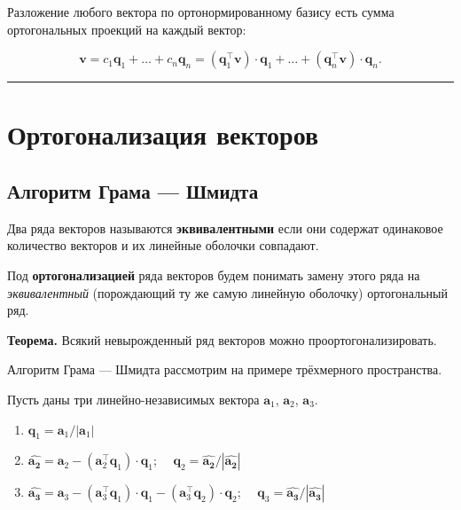 \documentclass[11pt,a4paper]{article}
\providecommand{\tightlist}{%
      \setlength{\itemsep}{0pt}\setlength{\parskip}{0pt}}
\begin{document}
Разложение любого вектора по ортонормированному базису есть сумма
ортогональных проекций на каждый вектор:

\[
  \mathbf{v} = c_1 \mathbf{q}_1 + \ldots + c_n \mathbf{q}_n = (\mathbf{q}_1^\top \mathbf{v}) \cdot \mathbf{q}_1 + \ldots + (\mathbf{q}_n^\top \mathbf{v}) \cdot \mathbf{q}_n.
\]

    \begin{center}\rule{0.5\linewidth}{0.5pt}\end{center}

    \hypertarget{ux43eux440ux442ux43eux433ux43eux43dux430ux43bux438ux437ux430ux446ux438ux44f-ux432ux435ux43aux442ux43eux440ux43eux432}{%
\section{Ортогонализация
векторов}\label{ux43eux440ux442ux43eux433ux43eux43dux430ux43bux438ux437ux430ux446ux438ux44f-ux432ux435ux43aux442ux43eux440ux43eux432}}

\hypertarget{ux430ux43bux433ux43eux440ux438ux442ux43c-ux433ux440ux430ux43cux430-ux448ux43cux438ux434ux442ux430}{%
\subsection{Алгоритм Грама ---
Шмидта}\label{ux430ux43bux433ux43eux440ux438ux442ux43c-ux433ux440ux430ux43cux430-ux448ux43cux438ux434ux442ux430}}

Два ряда векторов называются \textbf{эквивалентными} если они содержат
одинаковое количество векторов и их линейные оболочки совпадают.

Под \textbf{ортогонализацией} ряда векторов будем понимать замену этого
ряда на \emph{эквивалентный} (порождающий ту же самую линейную оболочку)
ортогональный ряд.

\textbf{Теорема.} Всякий невырожденный ряд векторов можно
проортогонализировать.

Алгоритм Грама --- Шмидта рассмотрим на примере трёхмерного
пространства.

Пусть даны три линейно-независимых вектора \(\mathbf{a}_1\),
\(\mathbf{a}_2\), \(\mathbf{a}_3\).

\begin{enumerate}
\def\labelenumi{\arabic{enumi}.}
\tightlist
\item
  \(\mathbf{q}_1 = \mathbf{a}_1 / |\mathbf{a}_1|\)
\item
  \(\mathbf{\hat{a_2}} = \mathbf{a}_2 - (\mathbf{a}_2^\top \mathbf{q}_1) \cdot \mathbf{q}_1\);
  \(\quad \mathbf{q}_2 = \mathbf{\hat{a_2}} / |\mathbf{\hat{a_2}}|\)
\item
  \(\mathbf{\hat{a_3}} = \mathbf{a}_3 - (\mathbf{a}_3^\top \mathbf{q}_1) \cdot \mathbf{q}_1 - (\mathbf{a}_3^\top \mathbf{q}_2) \cdot \mathbf{q}_2\);
  \(\quad \mathbf{q}_3 = \mathbf{\hat{a_3}}/|\mathbf{\hat{a_3}}|\)
\end{enumerate}
\end{document}
